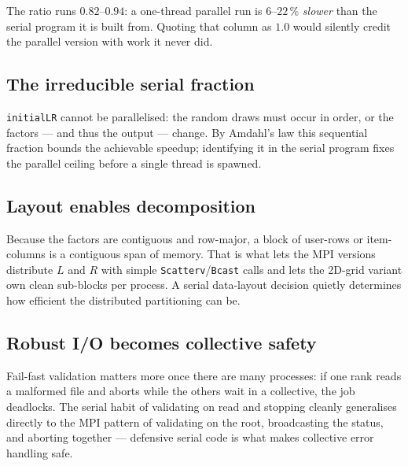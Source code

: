 \documentclass[twocolumn]{article}
\begin{document}
    The ratio runs $0.82$--$0.94$: a one-thread parallel run is $6$--$22\,\%$
    \emph{slower} than the serial program it is built from. Quoting that column as $1.0$
    would silently credit the parallel version with work it never did.

    \subsection{The irreducible serial fraction}\label{subsec:amdahl}
    \texttt{initialLR} cannot be parallelised: the random draws must occur in order, or
    the factors --- and thus the output --- change. By Amdahl's law this sequential
    fraction bounds the achievable speedup; identifying it in the serial program fixes
    the parallel ceiling before a single thread is spawned.

    \subsection{Layout enables decomposition}\label{subsec:decomp}
    Because the factors are contiguous and row-major, a block of user-rows or item-columns
    is a contiguous span of memory. That is what lets the MPI versions distribute $L$ and
    $R$ with simple \texttt{Scatterv}/\texttt{Bcast} calls and lets the 2D-grid variant
    own clean sub-blocks per process. A serial data-layout decision quietly determines how
    efficient the distributed partitioning can be.

    \subsection{Robust I/O becomes collective safety}\label{subsec:collective}
    Fail-fast validation matters more once there are many processes: if one rank reads a
    malformed file and aborts while the others wait in a collective, the job deadlocks.
    The serial habit of validating on read and stopping cleanly generalises directly to
    the MPI pattern of validating on the root, broadcasting the status, and aborting
    together --- defensive serial code is what makes collective error handling safe.
\end{document}

